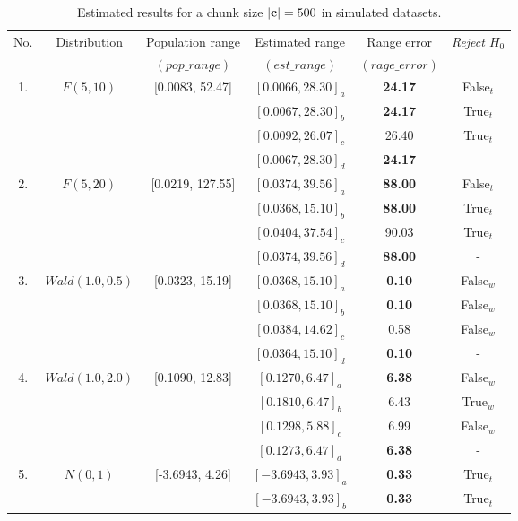 \documentclass[a4paper,fleqn]{cas-dc}
\begin{document}
\begin{table}[h!]
\centering
\caption{Estimated results for a chunk size $|{\bf c}|=500$ in simulated datasets.}
\label{tab:res_sim500nonoise}
\begin{threeparttable}
\begin{tabular}{|c|c|c|c|c|c|}
\hline
\multirow{2}{*}{No.} & \multirow{2}{*}{Distribution} & Population range & 
Estimated range&Range error& \multirow{2}{*}{\it{Reject} $H_0$} \\
&&$(pop\_range)$&$(est\_range)$&$(rage\_error)$& \\
\hline
\multirow{4}{*}{1.} & \multirow{4}{*}{$F(5 ,10)$}&\multirow{4}{*}{[0.0083, 52.47]} & $[0.0066, 28.30]_a$& 
    \bf{24.17} & False$_t$\\
&&&$[0.0067, 28.30]_b$ & \bf{24.17} & True$_t$\\
&&&$[0.0092, 26.07]_c$ & 26.40 & True$_t$\\
&&&$[0.0067, 28.30]_d$ & \bf{24.17} & - \\
\hline
\multirow{4}{*}{2.} & \multirow{4}{*}{$F(5 ,20)$}&\multirow{4}{*}{[0.0219, 127.55]} & $[0.0374, 39.56]_a$& 
    \bf{88.00} & False$_t$\\
&&&$[0.0368, 15.10]_b$ & \bf{88.00} &  True$_t$\\
&&&$[0.0404, 37.54]_c$ & 90.03 &  True$_t$\\
&&&$[0.0374, 39.56]_d$ & \bf{88.00} &  - \\
\hline
\multirow{4}{*}{3.} & \multirow{4}{*}{$Wald(1.0 ,0.5)$}&\multirow{4}{*}{[0.0323, 15.19]} & 
$[0.0368, 15.10]_a$& 
    \bf{0.10} &False$_w$\\
    &&&$[0.0368, 15.10]_b$ & \bf{0.10} & False$_w$\\
    &&&$[0.0384, 14.62]_c$ & 0.58 & False$_w$\\
    &&&$[0.0364, 15.10]_d$ & \bf{0.10} & - \\
\hline
\multirow{4}{*}{4.} & \multirow{4}{*}{$Wald(1.0 ,2.0)$}&\multirow{4}{*}{[0.1090, 12.83]} & 
$[0.1270, 6.47]_a$& 
    \bf{6.38} & False$_w$\\
    &&&$[0.1810, 6.47]_b$ & 6.43      & True$_w$\\
    &&&$[0.1298, 5.88]_c$ & 6.99      & False$_w$\\
    &&&$[0.1273, 6.47]_d$ & \bf{6.38} & - \\
\hline
\multirow{4}{*}{5.} & \multirow{4}{*}{$N(0 ,1)$}&\multirow{4}{*}{[-3.6943, 4.26]} & $[-3.6943, 3.93]_a$& 
    \bf{0.33} & True$_t$\\
    &&&$[-3.6943, 3.93]_b$ & \bf{0.33} & True$_t$\\

\end{tabular}
\end{threeparttable}
\end{table}
\end{document}

